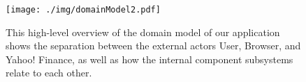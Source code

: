 \begin{figure}
\centering
\label{domainModel2}
\texttt{[image: ./img/domainModel2.pdf]}
\caption{This high-level overview of the domain model of our application shows the 
separation between the external actors User, Browser, and Yahoo! Finance, as well as
how the internal component subsystems relate to each other.}
\end{figure}
%
%
